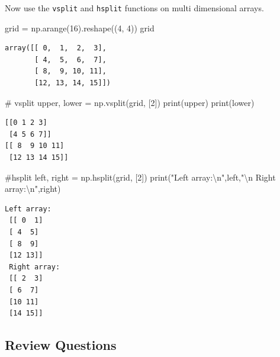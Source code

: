 \documentclass[
  letterpaper,
  DIV=11,
  numbers=noendperiod]{scrreprt}
\newenvironment{Shaded}{\begin{snugshade}}{\end{snugshade}}
\newcommand{\BuiltInTok}[1]{\textcolor[rgb]{0.00,0.23,0.31}{#1}}
\newcommand{\CharTok}[1]{\textcolor[rgb]{0.13,0.47,0.30}{#1}}
\newcommand{\CommentTok}[1]{\textcolor[rgb]{0.37,0.37,0.37}{#1}}
\newcommand{\DecValTok}[1]{\textcolor[rgb]{0.68,0.00,0.00}{#1}}
\newcommand{\NormalTok}[1]{\textcolor[rgb]{0.00,0.23,0.31}{#1}}
\newcommand{\OperatorTok}[1]{\textcolor[rgb]{0.37,0.37,0.37}{#1}}
\newcommand{\StringTok}[1]{\textcolor[rgb]{0.13,0.47,0.30}{#1}}
\theoremstyle{plain}
\theoremstyle{definition}
\theoremstyle{remark}
\begin{document}
Now use the \texttt{vsplit} and \texttt{hsplit} functions on multi
dimensional arrays.

\begin{Shaded}
\begin{Highlighting}[]
\NormalTok{grid }\OperatorTok{=}\NormalTok{ np.arange(}\DecValTok{16}\NormalTok{).reshape((}\DecValTok{4}\NormalTok{, }\DecValTok{4}\NormalTok{))}
\NormalTok{grid}
\end{Highlighting}
\end{Shaded}

\begin{verbatim}
array([[ 0,  1,  2,  3],
       [ 4,  5,  6,  7],
       [ 8,  9, 10, 11],
       [12, 13, 14, 15]])
\end{verbatim}

\begin{Shaded}
\begin{Highlighting}[]
\CommentTok{\# vsplit}
\NormalTok{upper, lower }\OperatorTok{=}\NormalTok{ np.vsplit(grid, [}\DecValTok{2}\NormalTok{])}
\BuiltInTok{print}\NormalTok{(upper)}
\BuiltInTok{print}\NormalTok{(lower)}
\end{Highlighting}
\end{Shaded}

\begin{verbatim}
[[0 1 2 3]
 [4 5 6 7]]
[[ 8  9 10 11]
 [12 13 14 15]]
\end{verbatim}

\begin{Shaded}
\begin{Highlighting}[]
\CommentTok{\#hsplit}
\NormalTok{left, right }\OperatorTok{=}\NormalTok{ np.hsplit(grid, [}\DecValTok{2}\NormalTok{])}
\BuiltInTok{print}\NormalTok{(}\StringTok{"Left array:}\CharTok{\textbackslash{}n}\StringTok{"}\NormalTok{,left,}\StringTok{"}\CharTok{\textbackslash{}n}\StringTok{ Right array:}\CharTok{\textbackslash{}n}\StringTok{"}\NormalTok{,right)}
\end{Highlighting}
\end{Shaded}

\begin{verbatim}
Left array:
 [[ 0  1]
 [ 4  5]
 [ 8  9]
 [12 13]] 
 Right array:
 [[ 2  3]
 [ 6  7]
 [10 11]
 [14 15]]
\end{verbatim}

\subsection{Review Questions}\label{review-questions-1}
\end{document}
